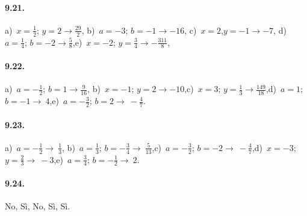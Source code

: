 \paragraph{9.21.}
a)~$x=\frac{1}{2}$; $y=2 \rightarrow \frac{29}{2}$, \quad b)~$a=-3$; $b=-1 \rightarrow -16$, \quad c)~$x=2$,$y=-1 \rightarrow -7$,
d)~$a=\frac{1}{4}$; $b=-2 \rightarrow \frac{5}{8}$,\quad e)~$x=-2$; $y=\frac{3}{4} \rightarrow -\frac{311}8{}$,\quad
\paragraph{9.22.}
a)~$a=-\frac{1}{2}$; $b=1 \rightarrow \frac{9}{16}$,
b)~$x=-1$; $y=2 \rightarrow -10$,\quad c)~$x=3$; $y=\frac{1}{3} \rightarrow \frac{149}{18}$,\quad d)~$a=1$; $b=-1 \rightarrow~4$,\quad e)~$a=-\frac{3}{2}$; $b=2 \rightarrow~-\frac{4}{7}$.
\paragraph{9.23.}
a)~$a=-\frac{1}{2} \rightarrow~\frac{1}{3}$,
b)~$a=\frac{1}{3}$; $b=-\frac{3}{4} \rightarrow~\frac{5}{13}$,\quad c)~$a=-\frac{3}{2}$; $b=-2 \rightarrow~-\frac{4}{7}$,\quad d)~$x=-3$; $y=\frac{2}{3} \rightarrow~-3$,\quad e)~$a=\frac{3}{4}$; $b=-\frac{1}{2} \rightarrow~2$.
\paragraph{9.24.} No, Sì, No, Sì, Sì.
